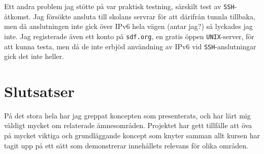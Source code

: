 Ett andra problem jag stötte på var praktisk testning, särskilt test av
\texttt{SSH}-åtkomst.  Jag försökte ansluta till skolans servrar för att
därifrån tunnla tillbaka, men då anslutningen inte gick över IPv6 hela vägen
(antar jag?) så lyckades jag inte.  Jag registerade även ett konto på
\texttt{sdf.org}, en gratis öppen \texttt{UNIX}-server, för att kunna testa,
men då de inte erbjöd användning av IPv6 vid \texttt{SSH}-anslutningar gick det
inte heller.


\section{Slutsatser}
På det stora hela har jag greppat koncepten som presenterats, och har lärt mig
väldigt mycket om relaterade ämnesområden. Projektet har gett tillfälle att öva
på mycket viktiga och grundläggande koncept som knyter samman allt kursen har
tagit upp på ett sätt som demonstrerar innehållets relevans för olika områden.
